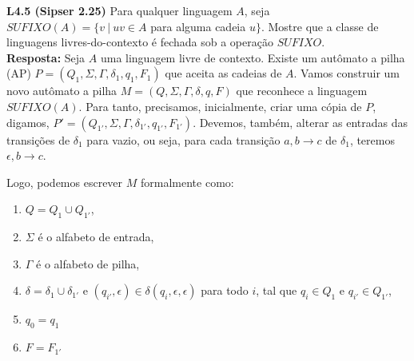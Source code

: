 
\noindent \textbf{L4.5 (Sipser 2.25)} Para qualquer linguagem $A$, seja $SUFIXO(A) = \{v \ |\ uv \in A$ para alguma cadeia $u\}$. Mostre que a classe de linguagens livres-do-contexto é fechada sob a operação $SUFIXO$.\\[3pt]
\textbf{Resposta: } Seja $A$ uma linguagem livre de contexto. Existe um autômato a pilha (AP) $P = (Q_1, \Sigma, \Gamma, \delta_1, q_1, F_1)$ que aceita as cadeias de $A$. Vamos construir um novo autômato a pilha $M = (Q, \Sigma, \Gamma, \delta, q, F)$ que reconhece a linguagem $SUFIXO(A)$. Para tanto, precisamos, inicialmente, criar uma cópia de $P$, digamos, $P' = (Q_{1'}, \Sigma, \Gamma, \delta_{1'}, q_{1'}, F_{1'})$. Devemos, também, alterar as entradas das transições de $\delta_1$ para vazio, ou seja, para cada transição $a, b \rightarrow c$ de $\delta_1$, teremos $\epsilon, b \rightarrow c$.

Logo, podemos escrever $M$ formalmente como:
\begin{enumerate}[label=\textbf{\arabic*.}]
    \item $Q = Q_1 \cup Q_{1'}$,
    \item $\Sigma$ é o alfabeto de entrada,
    \item $\Gamma$ é o alfabeto de pilha,
    \item $\delta = \delta_1 \cup \delta_{1'}$ e $(q_{i'}, \epsilon) \in \delta(q_i, \epsilon, \epsilon)$ para todo $i$, tal que $q_i \in Q_1$ e $q_{i'} \in Q_{1'}$,
    \item $q_0 = q_1$
    \item $F = F_{1'}$
\end{enumerate}

